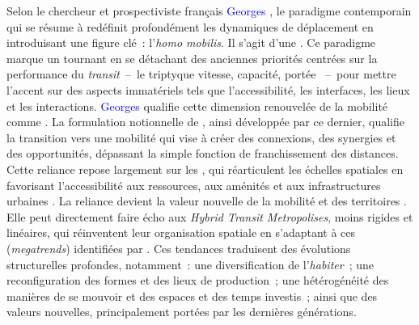 \begin{refsegment}
Selon le chercheur et prospectiviste français \textcolor{blue}{Georges} \textcolor{blue}{\textcite[13]{amar_homo_2016}}, le paradigme contemporain qui se résume à  redéfinit profondément les dynamiques de déplacement en introduisant une figure clé~: l’\textsl{homo mobilis}. Il s'agit d'une . Ce paradigme marque un tournant en se détachant des anciennes priorités centrées sur la performance du \textsl{transit}~–~le triptyque vitesse, capacité, portée \textcolor{blue}{\autocite[207]{sheller_new_2006}}~–~pour mettre l’accent sur des aspects immatériels tels que l’accessibilité, les interfaces, les lieux et les interactions. \textcolor{blue}{Georges} \textcolor{blue}{\textcite[14]{amar_homo_2016}} qualifie cette dimension renouvelée de la mobilité comme . La formulation notionnelle de , ainsi développée par ce dernier, qualifie la transition vers une mobilité qui vise à créer des connexions, des synergies et des opportunités, dépassant la simple fonction de franchissement des distances. Cette reliance repose largement sur les  \textcolor{blue}{\autocite[103, 222]{amar_homo_2016}}, qui réarticulent les échelles spatiales en favorisant l’accessibilité  aux ressources, aux aménités et aux infrastructures urbaines \textcolor{blue}{\autocites{marzloff_trottinette_2019}[2]{silva_proximity-centred_2023}}. La reliance devient la valeur nouvelle de la mobilité et des territoires \textcolor{blue}{\autocite[12, 99]{amar_homo_2016}}. Elle peut directement faire écho aux \textsl{Hybrid Transit Metropolises}, moins rigides et linéaires, qui réinventent leur organisation spatiale en s’adaptant à ces  (\textsl{megatrends}) identifiées par \textcolor{blue}{\textcite[133]{cervero_transit_2020}}. Ces tendances traduisent des évolutions structurelles profondes, notamment~: une diversification de l'\textsl{habiter}~; une reconfiguration des formes et des lieux de production~; une hétérogénéité des manières de se mouvoir et des espaces et des temps investis~; ainsi que des valeurs nouvelles, principalement portées par les dernières générations.%


\end{refsegment}
